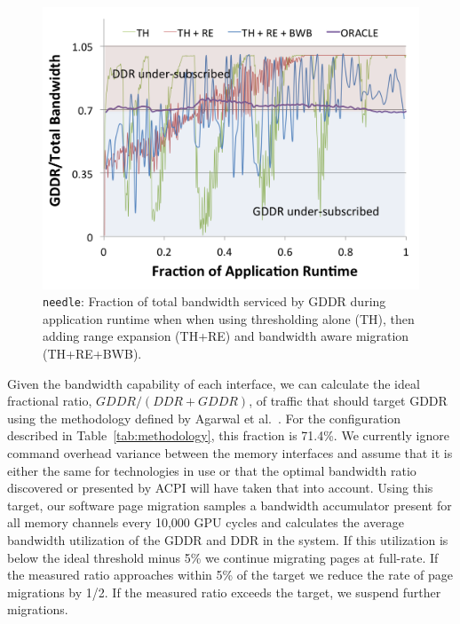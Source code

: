 \begin{figure}[t]
\centering
    \includegraphics[width=0.9\columnwidth]{hpca2015/figures/needle-bw-ratio.png}
    \caption{{\tt needle}: Fraction of total bandwidth serviced by GDDR during application
runtime when when using thresholding alone (TH), then adding range expansion
(TH+RE) and bandwidth aware migration (TH+RE+BWB).}
    \label{fig:migrationlimiting-needle}
\end{figure}

Given the bandwidth capability of each interface, we can calculate the ideal fractional ratio, $GDDR / (DDR + GDDR)$, of traffic that should 
target GDDR using the methodology defined by Agarwal et al.~\cite{Agarwal2015}. For the configuration described in Table~\ref{tab:methodology},
this fraction is 71.4\%.  We currently ignore command overhead
variance between the memory interfaces and assume that it is either the same for technologies in use or that
the optimal bandwidth ratio discovered or presented by ACPI will have taken that into account.  Using this target,
our software page migration samples a bandwidth accumulator present for all memory channels every 10,000 
GPU cycles and calculates the average bandwidth utilization of the GDDR and DDR in the system.  If this utilization
is below the ideal threshold minus 5\% we continue migrating pages at full-rate.  If the measured ratio approaches within 5\% of the target
we reduce the rate of page migrations by 1/2.  If the measured ratio exceeds the target, we suspend further migrations.

